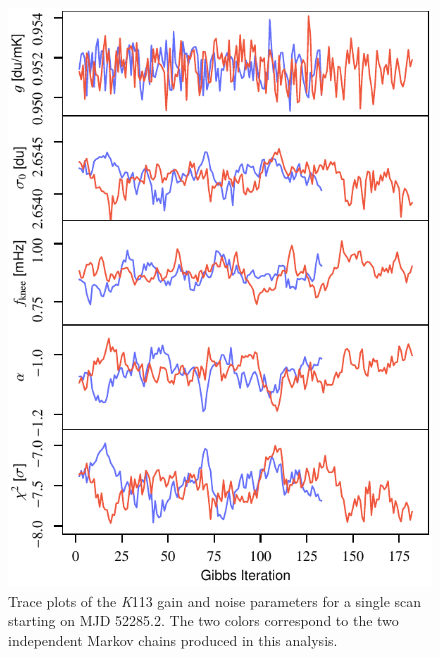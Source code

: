 \documentclass[twocolumn]{../../common/aa}
\newcommand{\K}[0]{\textit K}
\begin{document}

\begin{figure}[t]
	\centering
	\includegraphics[width=\linewidth]{figures/instpar_CG_K113_samples_v1.pdf}
	\caption{Trace plots of the \K113 gain and noise parameters for a single scan starting on MJD 52285.2. The two colors correspond to the two independent Markov chains produced in this analysis.}
	\label{fig:inst_K113_gibbs}
\end{figure}
\end{document}
